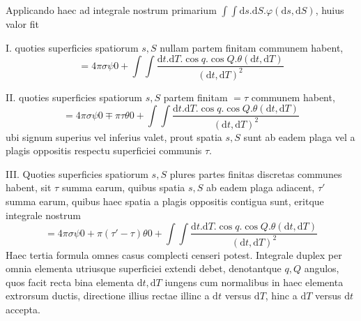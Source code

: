 Applicando haec ad integrale nostrum primarium $\int\int\mathrm{d}s.\mathrm{d}S.\varphi(\mathrm{d}s,\mathrm{d}S)$, huius valor fit

I. quoties superficies spatiorum $s,S$ nullam partem finitam communem habent,
\[
=4\pi\sigma\psi0+\int\int\frac{\mathrm{d}t.\mathrm{d}T.\cos q.\cos Q.\theta(\mathrm{d}t,\mathrm{d}T)}{(\mathrm{d}t,\mathrm{d}T)^2}
\]

II. quoties superficies spatiorum $s,S$ partem finitam $=\tau$ communem habent,
\[
=4\pi\sigma\psi0\mp\pi\tau\theta0+\int\int\frac{\mathrm{d}t.\mathrm{d}T.\cos q.\cos Q.\theta(\mathrm{d}t,\mathrm{d}T)}{(\mathrm{d}t,\mathrm{d}T)^2}
\]
ubi signum superius vel inferius valet, prout spatia $s,S$ sunt ab eadem plaga vel a plagis oppositis respectu superficiei communis $\tau$.

III. Quoties superficies spatiorum $s,S$ plures partes finitas discretas communes habent, sit $\tau$ summa earum, quibus spatia $s,S$ ab eadem plaga adiacent, $\tau'$ summa earum, quibus haec spatia a plagis oppositis contigua sunt, eritque integrale nostrum
\[
=4\pi\sigma\psi0+\pi(\tau'-\tau)\theta0+\int\int\frac{\mathrm{d}t.\mathrm{d}T.\cos q.\cos Q.\theta(\mathrm{d}t,\mathrm{d}T)}{(\mathrm{d}t,\mathrm{d}T)^2}
\]
Haec tertia formula omnes casus complecti censeri potest. Integrale duplex per omnia elementa utriusque superficiei extendi debet, denotantque $q,Q$ angulos, quos facit recta bina elementa $\mathrm{d}t,\mathrm{d}T$ iungens cum normalibus in haec elementa extrorsum ductis, directione illius rectae illinc a $\mathrm{d}t$ versus $\mathrm{d}T$, hinc a $\mathrm{d}T$ versus $\mathrm{d}t$ accepta.

